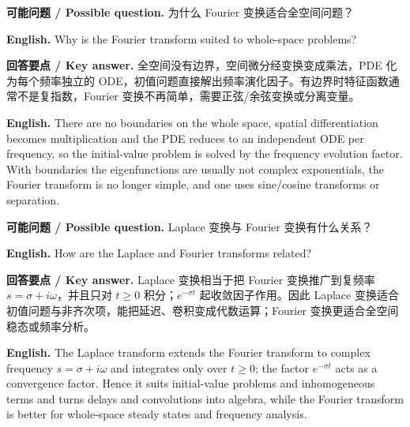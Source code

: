 \documentclass[UTF8,11pt,a4paper]{ctexart}
\newcommand{\EN}[1]{\par\noindent \textbf{English.} #1\par}
\newcommand{\ASK}[4]{\par\noindent \textbf{可能问题 / Possible question.} #1\par\EN{#2}\noindent \textbf{回答要点 / Key answer.} #3\par\EN{#4}\medskip}
\begin{document}
\ASK{为什么 Fourier 变换适合全空间问题？}{Why is the Fourier transform suited to whole-space problems?}{全空间没有边界，空间微分经变换变成乘法，PDE 化为每个频率独立的 ODE，初值问题直接解出频率演化因子。有边界时特征函数通常不是复指数，Fourier 变换不再简单，需要正弦/余弦变换或分离变量。}{There are no boundaries on the whole space, spatial differentiation becomes multiplication and the PDE reduces to an independent ODE per frequency, so the initial-value problem is solved by the frequency evolution factor. With boundaries the eigenfunctions are usually not complex exponentials, the Fourier transform is no longer simple, and one uses sine/cosine transforms or separation.}
\ASK{Laplace 变换与 Fourier 变换有什么关系？}{How are the Laplace and Fourier transforms related?}{Laplace 变换相当于把 Fourier 变换推广到复频率 $s=\sigma+i\omega$，并且只对 $t\ge0$ 积分；$e^{-\sigma t}$ 起收敛因子作用。因此 Laplace 变换适合初值问题与非齐次项，能把延迟、卷积变成代数运算；Fourier 变换更适合全空间稳态或频率分析。}{The Laplace transform extends the Fourier transform to complex frequency $s=\sigma+i\omega$ and integrates only over $t\ge0$; the factor $e^{-\sigma t}$ acts as a convergence factor. Hence it suits initial-value problems and inhomogeneous terms and turns delays and convolutions into algebra, while the Fourier transform is better for whole-space steady states and frequency analysis.}
\end{document}
